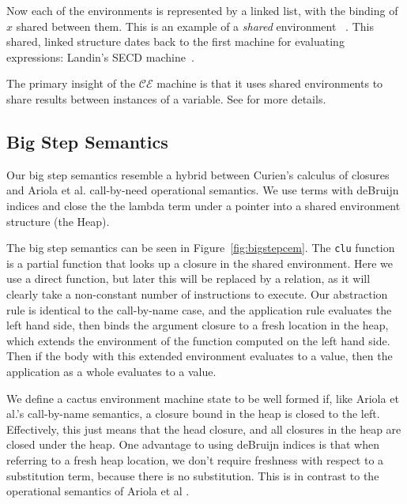 \begin{center}
\end{center}

Now each of the environments is represented by a linked list, with the binding
of $x$ shared between them. This is an example of a \emph{shared} environment
~\cite{appel1988optimizing}. This shared, linked structure dates back to the 
first machine for evaluating expressions: Landin's SECD
machine~\cite{landin1964mechanical}.

The primary insight of the $\mathcal{CE}$ machine is that it uses shared
environments to share results between instances of a variable. See \cite{cem}
for more details.

\subsection{Big Step Semantics}

Our big step semantics resemble a hybrid between Curien's calculus of closures
and Ariola et al. call-by-need operational semantics. We use terms with deBruijn
indices and close the the lambda term under a pointer into a shared environment
structure (the Heap).  

The big step semantics can be seen in Figure~\ref{fig:bigstepcem}. The
\texttt{clu} function is a partial function that looks up a closure in the
shared environment. Here we use a direct function, but later this will be
replaced by a relation, as it will clearly take a non-constant number of
instructions to execute. Our abstraction rule is identical to the call-by-name
case, and the application rule evaluates the left hand side, then binds the
argument closure to a fresh location in the heap, which extends the environment
of the function computed on the left hand side. Then if the body with this
extended environment evaluates to a value, then the application as a whole
evaluates to a value.

We define a cactus environment machine state to be well formed if, like Ariola 
et al.'s call-by-name semantics, a closure bound in the heap is closed to the
left.  Effectively, this just means that the head closure, and all closures in
the heap are closed under the heap. One advantage to using deBruijn indices is
that when referring to a fresh heap location, we don't require freshness with
respect to a substitution term, because there is no substitution. This is in
contrast to the operational semantics of Ariola et al \cite{ariola1995call}.

